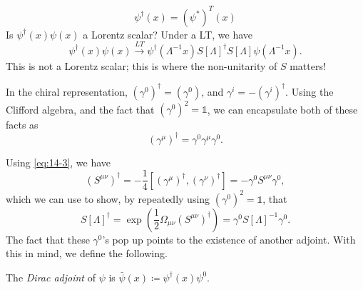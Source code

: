 \begin{equation}
  \psi^{\dagger}(x) = (\psi^*)^T(x)
\end{equation}
Is $\psi^{\dagger}(x) \psi(x)$ a Lorentz scalar?
Under a LT, we have
\begin{equation}
  \psi^{\dagger}(x) \psi(x) \xrightarrow{LT} \psi^{\dagger}(\Lambda^{-1}x) S[\Lambda]^{\dagger} S[\Lambda] \psi(\Lambda^{-1} x).
\end{equation}
This is not a Lorentz scalar; this is where the non-unitarity of $S$ matters! 
\begin{leftbar}
  \begin{remark}
    In the chiral representation, $(\gamma^0)^{\dagger} = (\gamma^0)$, and $\gamma^i = -(\gamma^i)^{\dagger}$. Using the Clifford algebra, and the fact that $(\gamma^0)^2 = \mathbb{1}$, we can encapsulate both of these facts as
    \begin{equation}
      \label{eq:14-3}
      (\gamma^{\mu})^{\dagger} = \gamma^0 \gamma^{\mu} \gamma^0.
    \end{equation}
  \end{remark}
\end{leftbar}
Using \eqref{eq:14-3}, we have
\begin{equation}
  (S^{\mu\nu})^{\dagger} = - \frac{1}{4} [(\gamma^{\mu})^{\dagger}, (\gamma^{\nu})^{\dagger}] = -\gamma^0 S^{\mu\nu} \gamma^0,
\end{equation}
which we can use to show, by repeatedly using $(\gamma^0)^2 = \mathbb{1}$, that
\begin{equation}
  S[\Lambda]^{\dagger} = \exp(\frac{1}{2} \Omega_{\mu\nu} (S^{\mu\nu})^{\dagger}) = \gamma^0 S[\Lambda]^{-1} \gamma^0.
\end{equation}
The fact that these $\gamma^0$'s pop up points to the existence of another adjoint. With this in mind, we define the following.
\begin{definition}[]
  The \emph{Dirac adjoint} of $\psi$ is $\bar \psi(x) \coloneqq \psi^{\dagger}(x) \psi^0$.
\end{definition}


